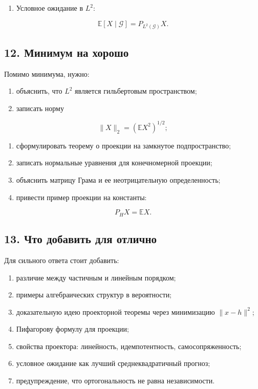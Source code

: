 \documentclass[
  11pt,
  a4paper,
]{article}
\providecommand{\tightlist}{%
  \setlength{\itemsep}{0pt}\setlength{\parskip}{0pt}}
\begin{document}
\begin{enumerate}
\def\labelenumi{\arabic{enumi}.}
\setcounter{enumi}{5}
\tightlist
\item
  Условное ожидание в \(L^2\):
\end{enumerate}

\[
\mathbb E[X\mid\mathcal G]
=
P_{L^2(\mathcal G)}X.
\]

\subsection{12. Минимум на
хорошо}\label{ux43cux438ux43dux438ux43cux443ux43c-ux43dux430-ux445ux43eux440ux43eux448ux43e}

Помимо минимума, нужно:

\begin{enumerate}
\def\labelenumi{\arabic{enumi}.}
\tightlist
\item
  объяснить, что \(L^2\) является гильбертовым пространством;
\item
  записать норму
\end{enumerate}

\[
\|X\|_2=(\mathbb EX^2)^{1/2};
\]

\begin{enumerate}
\def\labelenumi{\arabic{enumi}.}
\setcounter{enumi}{2}
\tightlist
\item
  сформулировать теорему о проекции на замкнутое подпространство;
\item
  записать нормальные уравнения для конечномерной проекции;
\item
  объяснить матрицу Грама и ее неотрицательную определенность;
\item
  привести пример проекции на константы:
\end{enumerate}

\[
P_HX=\mathbb EX.
\]

\subsection{13. Что добавить для
отлично}\label{ux447ux442ux43e-ux434ux43eux431ux430ux432ux438ux442ux44c-ux434ux43bux44f-ux43eux442ux43bux438ux447ux43dux43e}

Для сильного ответа стоит добавить:

\begin{enumerate}
\def\labelenumi{\arabic{enumi}.}
\tightlist
\item
  различие между частичным и линейным порядком;
\item
  примеры алгебраических структур в вероятности;
\item
  доказательную идею проекторной теоремы через минимизацию
  \(\|x-h\|^2\);
\item
  Пифагорову формулу для проекции;
\item
  свойства проектора: линейность, идемпотентность, самосопряженность;
\item
  условное ожидание как лучший среднеквадратичный прогноз;
\item
  предупреждение, что ортогональность не равна независимости.
\end{enumerate}
\end{document}
